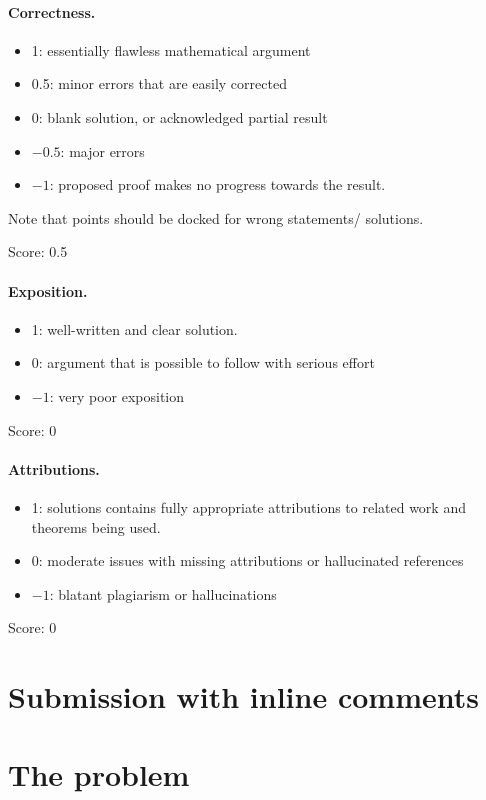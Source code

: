 \documentclass[11pt]{article}
\theoremstyle{definition}
\theoremstyle{remark}
\begin{document}
\paragraph{Correctness.}
\begin{itemize}
	\item  1: essentially flawless mathematical argument
	\item  0.5: minor errors that are easily corrected
	\item  0: blank solution, or acknowledged partial result
	\item  $-0.5$: major errors
	\item  $-1$: proposed proof makes no progress towards the result.
\end{itemize}
Note that points should be docked for wrong statements/ solutions.

\noindent Score: 0.5

\paragraph{Exposition.}
\begin{itemize}
	\item  1: well-written and clear solution.
	\item  0: argument that is possible to follow with serious effort
	\item  $-1$: very poor exposition
\end{itemize}

\noindent Score: 0

\paragraph{Attributions.}
\begin{itemize}
	\item  1: solutions contains fully appropriate attributions
		to related work and theorems being used.
	\item  0: moderate issues with missing attributions or hallucinated references
	\item  $-1$: blatant plagiarism or hallucinations
\end{itemize}

\noindent Score: 0

\newpage
\section{Submission with inline comments}


\section{The problem}
\end{document}
